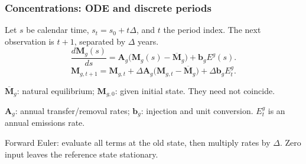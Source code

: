 \documentclass[xcolor=x11names,compress,aspectratio=169]{beamer}%
\makeatletter
\renewenvironment{itemize}{\begin{compactitemize}[<+-| alert@+>]}{\end{compactitemize}}
\makeatother
\begin{document}
\begin{frame}
\frametitle{Concentrations: ODE and discrete periods}
\small
Let $s$ be calendar time, $s_t=s_0+t\Delta$, and $t$ the period index.
The next observation is $t+1$, separated by $\Delta$ years.
\[
\frac{d\mathbf M_g(s)}{ds}
=\mathbf A_g\big(\mathbf M_g(s)-\overline{\mathbf M}_g\big)
+\mathbf b_g E^g(s).
\]
\[
\boxed{\mathbf M_{g,t+1}=\mathbf M_{g,t}
+\Delta\mathbf A_g\big(\mathbf M_{g,t}-\overline{\mathbf M}_g\big)
+\Delta\mathbf b_g E^g_t.}
\]
\begin{itemize}
\item $\overline{\mathbf M}_g$: natural equilibrium; $\mathbf M_{g,0}$:
given initial state. They need not coincide.
\item $\mathbf A_g$: annual transfer/removal rates; $\mathbf b_g$:
injection and unit conversion. $E^g_t$ is an annual emissions rate.
\item Forward Euler: evaluate all terms at the old state, then multiply
rates by $\Delta$. Zero input leaves the reference state stationary.
\end{itemize}
\transboxout
\end{frame}
%
\end{document}
